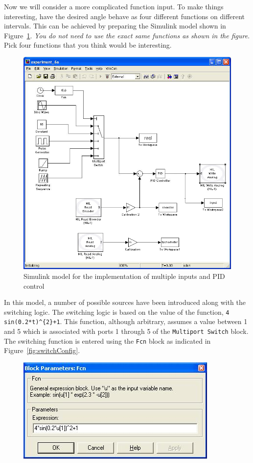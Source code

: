 \begin{enumerate}
          Now we will consider a more complicated function input. To make things interesting, have the desired angle behave
          as four different functions on different intervals.  This can be achieved by
          preparing the \textsf{Simulink} model shown in Figure~\ref{fig:multiSwitch}\@.
          \emph{You do not need to use the exact same functions as shown in the figure}. Pick
          four functions that you think would be interesting.
          \begin{figure}[H]
              \centering
              \includegraphics[width=0.6\hsize]{pix/lab6b.jpg}
              \caption{\textsf{Simulink} model for the implementation of multiple inputs and PID control}\label{fig:multiSwitch}
          \end{figure}%
          In this model, a number of possible sources have been introduced along with
          the switching logic.  The switching logic is based on the value of the
          function, \verb|4 sin(0.2*t)^{2}+1|.  This function, although arbitrary,
          assumes a value between 1 and 5 which is associated with ports 1 through 5 of
          the \verb|Multiport Switch| block.  The switching function is entered using
          the \verb|Fcn| block as indicated in Figure~\ref{fig:switchConfig}\@.
          \begin{figure}[H]
              \centering
              \includegraphics[width=0.6\hsize]{pix/fcnParameters.jpg}

\end{figure}
\end{enumerate}
